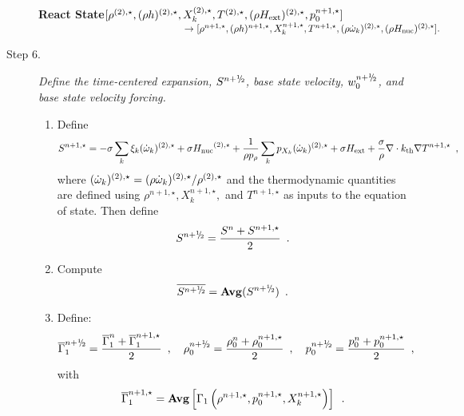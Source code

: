 \begin{description}
{\bf React State}$[ \rho^{(2),\star},(\rho h)^{(2),\star}, X_k^{(2),\star}, T^{(2),\star}, 
(\rho{H_{\rm ext}})^{(2),\star}, p_0^{n+1,\star}] $\\
$~~~~~~~~~~~~~~~~~~~~~~~~~~~~~~~~~~~~~~~~~~~~~
\rightarrow [ \rho^{n+1,\star},(\rho h)^{n+1,\star}, 
X_k^{n+1,\star}, T^{n+1,\star}, (\rho \dot{\omega}_k)^{(2),\star}, (\rho {H_{\rm nuc}})^{(2),\star} ].$

\item[Step 6.] {\em Define the time-centered expansion, $S^{n+\myhalf}$, base state
velocity, $w_0^{n+\myhalf}$, and base state velocity forcing.}

\begin{enumerate}
\renewcommand{\theenumi}{{\bf \alph{enumi}}}
\item Define
\begin{equation}
  S^{n+1,\star} =  -\sigma  \sum_k  \xi_k  (\dot{\omega}_k)^{(2),\star}  + 
  \sigma {H_{\rm nuc}}^{(2),\star} +
  \frac{1}{\rho p_\rho} \sum_k p_{X_k}  ({\dot{\omega}}_k)^{(2),\star}  
  + \sigma {H_{\rm ext}} + \frac{\sigma}{\rho}\nabla\cdot k_{\rm th}\nabla T^{n+1,\star} \enskip ,
\end{equation} 
where $(\dot{\omega}_k)^{(2),\star} = (\rho \dot{\omega}_k)^{(2),\star} / \rho^{(2),\star}$
and the thermodynamic quantities are defined using $\rho^{n+1,\star}, X_k^{n+1,\star},$ 
and $T^{n+1,\star}$ as inputs to the equation of state.
Then define
\begin{equation}
 S^\nph = \frac{S^n + S^{n+1,\star}}{2} \enskip. 
\end{equation}

\item Compute
\begin{equation}
\overline{S^{\nph}} = {\mathrm{\bf Avg}} (S^{\nph}) \enskip.
\end{equation}

\item Define:
\begin{equation}
\gammabar^{\nph} = \frac{\gammabar^{n} + \gammabar^{n+1,\star}}{2}\enskip , ~~~
\rhozero^{\nph} = \frac{\rhozero^{n} + \rhozero^{n+1,\star}}{2}\enskip , ~~~
p_0^{\nph} = \frac{p_0^{n} + p_0^{n+1,\star}}{2}\enskip ,
\end{equation}
with
\begin{equation}
 \overline{\Gamma}_1^{n+1,\star} = {\rm{\bf Avg}} 
\left[ \Gamma_1\left(\rho^{n+1,\star}, p_0^{n+1,\star}, X_k^{n+1,\star}\right) \right] 
\enskip .
\end{equation}


\end{enumerate}
\end{description}
